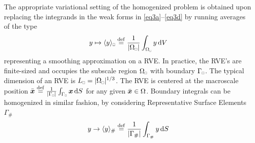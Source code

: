 \documentclass{bmcart}
\newcommand{\eqtrefrange}[2]{\eqref{#1}--\eqref{#2}}
\DeclarePairedDelimiter{\homgen}{\langle}{\rangle_\rve}
\newcommand{\volume}{|\Omega_\rve|}
\newcommand{\rve}{
  {\mathchoice
   {\mbox{\scalebox{0.67}{$\Box$}}}
   {\mbox{\scalebox{0.67}{$\Box$}}}
   {\mbox{\scalebox{0.5}{$\Box$}}}
   {\mbox{\scalebox{0.375}{$\Box$}}}
  }
}
\begin{document}
The appropriate variational setting of the homogenized problem is obtained upon replacing the integrands in the weak forms in \eqtrefrange{eq3a}{eq3d} by running averages of the type
\begin{equation}
    y \mapsto
    \homgen{y}\defeq \frac{1}{\volume}\int_{{\Omega}_\rve} y \dif V
    \label{eq16ba}
\end{equation}
representing a smoothing approximation on a RVE.
In practice, the RVE's are finite-sized and occupies the subscale region $\Omega_\rve$ with boundary $\Gamma_\rve$.
The typical dimension of an RVE is $L_\rve=\volume^{1/3}$.
The RVE is centered at the macroscale position $\bar{\ta{x}}\defeq\frac{1}{|\Gamma_\rve|}\int_{\Gamma_\rve} \ta{x}\dif S$ for any given $\bar{\boldsymbol{x}}\in\Omega$.
Boundary integrals can be homogenized in similar fashion, by considering Representative Surface Elements $\Gamma_\#$
\begin{align}
 y \to \langle y \rangle_{\#} \defeq \frac{1}{|\Gamma_\#|} \int_{\Gamma_\#} y \dif S
\end{align}
\end{document}

